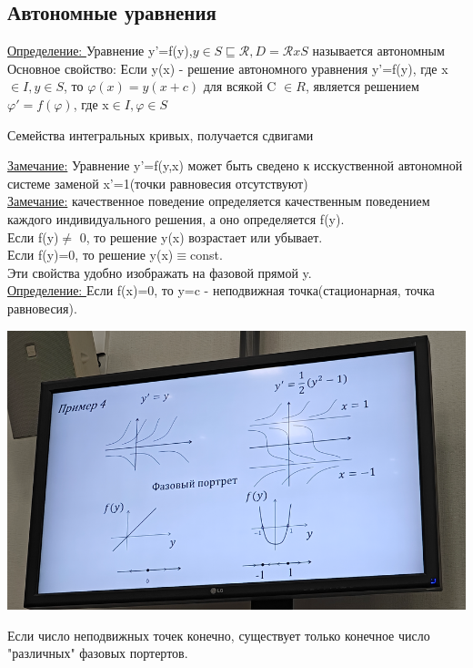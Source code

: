 \documentclass[12pt]{article}
\let\ORIincludegraphics\includegraphics
\renewcommand{\includegraphics}[2][]{\ORIincludegraphics[scale=0.65,#1]{#2}}
\begin{document}
  \subsection*{Автономные уравнения}
  \underline{Определение: } Уравнение y'=f(y),$y \in S \sqsubseteq \mathcal{R},D=\mathcal{R}xS$
  называется автономным\\
  Основное свойство: Если y(x) - решение автономного уравнения y'=f(y), где x $\in I,y \in S$,
  то $\varphi(x)=y(x+c)$ для всякой C $\in R$, является решением $\varphi'=f(\varphi)$,
  где x$\in I,\varphi \in S$\\
  \begin{center}
    Семейства интегральных кривых, получается сдвигами
  \end{center}
  \underline{Замечание:} Уравнение y'=f(y,x) может быть сведено к исскуственной автономной системе
  заменой x'=1(точки равновесия отсутствуют)\\
  \underline{Замечание:} качественное поведение определяется качественным поведением
  каждого индивидуального решения, а оно определяется f(y).\\
  Если f(y)$\not =$ 0, то решение y(x) возрастает или убывает.\\
  Если f(y)=0, то решение y(x)$\equiv $const.\\
  Эти свойства удобно изображать на фазовой прямой y.\\
  \underline{Определение: } Если f(x)=0, то y=c - неподвижная точка(стационарная, точка равновесия).
  \begin{center}
    \includegraphics{"1.4.4.png"}
  \end{center}
  Если число неподвижных точек конечно, существует только конечное число "различных"
  фазовых портертов.
\end{document}

